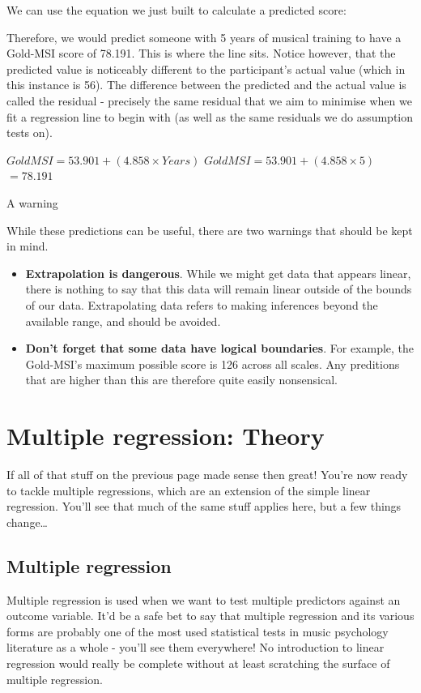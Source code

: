 \documentclass[
]{book}
\providecommand{\tightlist}{%
  \setlength{\itemsep}{0pt}\setlength{\parskip}{0pt}}
\begin{document}
We can use the equation we just built to calculate a predicted score:

Therefore, we would predict someone with 5 years of musical training to have a Gold-MSI score of 78.191. This is where the line sits. Notice however, that the predicted value is noticeably different to the participant's actual value (which in this instance is 56). The difference between the predicted and the actual value is called the residual - precisely the same residual that we aim to minimise when we fit a regression line to begin with (as well as the same residuals we do assumption tests on).

\(GoldMSI = 53.901 + (4.858 \times Years)\)
\(GoldMSI = 53.901 + (4.858 \times 5)\)
\(=78.191\)

A warning

While these predictions can be useful, there are two warnings that should be kept in mind.

\begin{itemize}
\tightlist
\item
  \textbf{Extrapolation is dangerous}. While we might get data that appears linear, there is nothing to say that this data will remain linear outside of the bounds of our data. Extrapolating data refers to making inferences beyond the available range, and should be avoided.
\item
  \textbf{Don't forget that some data have logical boundaries}. For example, the Gold-MSI's maximum possible score is 126 across all scales. Any preditions that are higher than this are therefore quite easily nonsensical.
\end{itemize}

\section{Multiple regression: Theory}\label{multiple-regression-theory}

If all of that stuff on the previous page made sense then great! You're now ready to tackle multiple regressions, which are an extension of the simple linear regression. You'll see that much of the same stuff applies here, but a few things change\ldots{}

\subsection{Multiple regression}\label{multiple-regression}

Multiple regression is used when we want to test multiple predictors against an outcome variable. It'd be a safe bet to say that multiple regression and its various forms are probably one of the most used statistical tests in music psychology literature as a whole - you'll see them everywhere! No introduction to linear regression would really be complete without at least scratching the surface of multiple regression.
\end{document}
